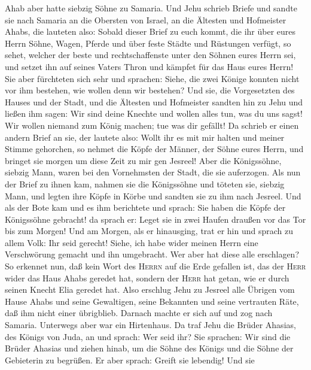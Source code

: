  Ahab aber hatte siebzig Söhne zu Samaria. Und Jehu
schrieb Briefe und sandte sie nach Samaria an die Obersten von Israel,
an die Ältesten und Hofmeister Ahabs, die lauteten also: 
Sobald dieser Brief zu euch kommt, die ihr über eures Herrn Söhne,
Wagen, Pferde und über feste Städte und Rüstungen verfügt, so sehet,
 welcher der beste und rechtschaffenste unter den Söhnen
eures Herrn sei, und setzet ihn auf seines Vaters Thron und kämpfet für
das Haus eures Herrn!  Sie aber fürchteten sich sehr und
sprachen: Siehe, die zwei Könige konnten nicht vor ihm bestehen, wie
wollen denn wir bestehen?  Und sie, die Vorgesetzten des
Hauses und der Stadt, und die Ältesten und Hofmeister sandten hin zu
Jehu und ließen ihm sagen: Wir sind deine Knechte und wollen alles tun,
was du uns sagst! Wir wollen niemand zum König machen; tue was dir
gefällt!  Da schrieb er einen andern Brief an sie, der
lautete also: Wollt ihr es mit mir halten und meiner Stimme gehorchen,
so nehmet die Köpfe der Männer, der Söhne eures Herrn, und bringet sie
morgen um diese Zeit zu mir gen Jesreel! Aber die Königssöhne, siebzig
Mann, waren bei den Vornehmsten der Stadt, die sie auferzogen.
 Als nun der Brief zu ihnen kam, nahmen sie die
Königssöhne und töteten sie, siebzig Mann, und legten ihre Köpfe in
Körbe und sandten sie zu ihm nach Jesreel.  Und als der
Bote kam und es ihm berichtete und sprach: Sie haben die Köpfe der
Königssöhne gebracht! da sprach er: Leget sie in zwei Haufen draußen vor
das Tor bis zum Morgen!  Und am Morgen, als er hinausging,
trat er hin und sprach zu allem Volk: Ihr seid gerecht! Siehe, ich habe
wider meinen Herrn eine Verschwörung gemacht und ihn umgebracht. Wer
aber hat diese alle erschlagen?  So erkennet nun, daß
kein Wort des \textsc{Herrn} auf die Erde gefallen ist, das der
\textsc{Herr} wider das Haus Ahabs geredet hat, sondern der
\textsc{Herr} hat getan, wie er durch seinen Knecht Elia geredet hat.
 Also erschlug Jehu zu Jesreel alle Übrigen vom Hause
Ahabs und seine Gewaltigen, seine Bekannten und seine vertrauten Räte,
daß ihm nicht einer übrigblieb.  Darnach machte er sich
auf und zog nach Samaria. Unterwegs aber war ein Hirtenhaus.
 Da traf Jehu die Brüder Ahasias, des Königs von Juda, an
und sprach: Wer seid ihr? Sie sprachen: Wir sind die Brüder Ahasias und
ziehen hinab, um die Söhne des Königs und die Söhne der Gebieterin zu
begrüßen.  Er aber sprach: Greift sie lebendig! Und sie
